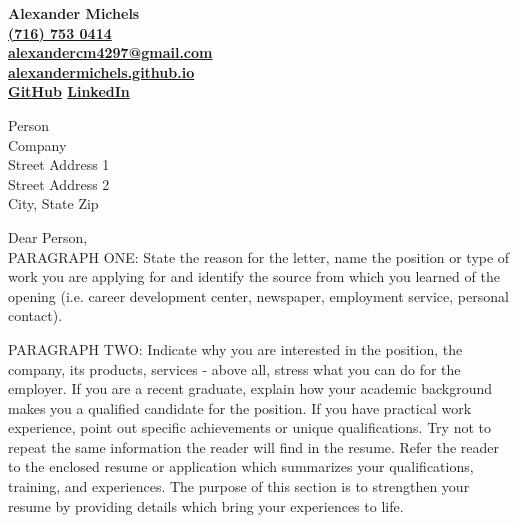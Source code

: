 \documentclass[12pt,fleqn,notitlepage,minimal]{article} %
\begin{document}
		
		\begin{center}
			\bf Alexander Michels \\ %
			\href{tel:+17167530414}{(716) 753 0414} \\
			\href{mailto:alexandercm4297@gmail.com}{alexandercm4297@gmail.com} \\ \href{http://alexandermichels.github.io}{alexandermichels.github.io} \\ \href{http://github.com/alexandermichels}{GitHub}  \hspace{.5cm}   \href{https://www.linkedin.com/in/alexmichels/}{LinkedIn}
		\end{center} 

\begin{flushleft}
	Person \\
	Company \\
	Street Address 1 \\
	Street Address 2 \\
	City, State Zip
\end{flushleft}

\vspace{.5cm}

\noindent Dear Person, \\

PARAGRAPH ONE: State the reason for the letter, name the position or type of work you are applying for and identify the source from which you learned of the opening (i.e. career development center, newspaper, employment service, personal contact).

PARAGRAPH TWO: Indicate why you are interested in the position, the company, its products, services - above all, stress what you can do for the employer. If you are a recent graduate, explain how your academic background makes you a qualified candidate for the position. If you have practical work experience, point out specific achievements or unique qualifications. Try not to repeat the same information the reader will find in the resume. Refer the reader to the enclosed resume or application which summarizes your qualifications, training, and experiences. The purpose of this section is to strengthen your resume by providing details which bring your experiences to life. 
 
\end{document}

